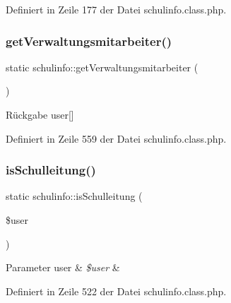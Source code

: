 Definiert in Zeile 177 der Datei schulinfo.\+class.\+php.

\mbox{\label{classschulinfo_a49649eb2eea39adfd114e1b793b935d1}} 
\subsubsection{\texorpdfstring{get\+Verwaltungsmitarbeiter()}{getVerwaltungsmitarbeiter()}}
{\footnotesize\ttfamily static schulinfo\+::get\+Verwaltungsmitarbeiter (\begin{DoxyParamCaption}{ }\end{DoxyParamCaption})\hspace{0.3cm}{\ttfamily [static]}}

\begin{DoxyReturn}{Rückgabe}
user\mbox{[}\mbox{]} 
\end{DoxyReturn}


Definiert in Zeile 559 der Datei schulinfo.\+class.\+php.

\mbox{\label{classschulinfo_a0a2600d00aa9a5b7feaf5e69a7707821}} 
\subsubsection{\texorpdfstring{is\+Schulleitung()}{isSchulleitung()}}
{\footnotesize\ttfamily static schulinfo\+::is\+Schulleitung (\begin{DoxyParamCaption}\item[{}]{\$user }\end{DoxyParamCaption})\hspace{0.3cm}{\ttfamily [static]}}


\begin{DoxyParams}[1]{Parameter}
user & {\em \$user} & \\
\hline
\end{DoxyParams}


Definiert in Zeile 522 der Datei schulinfo.\+class.\+php.

\mbox{\label{classschulinfo_ac588329bc290b4133b8c6f4f2e040c3f}} 
